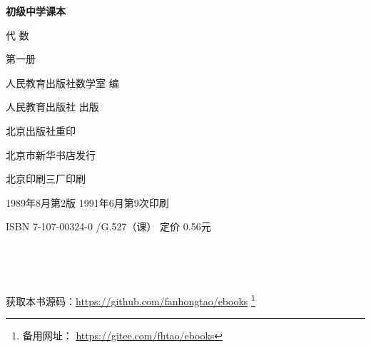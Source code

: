 \begin{titlepage}
    \begin{center}
        \vspace*{3cm}

        {\Large \textbf{初级中学课本} }

        \vspace{1cm}

        {\Huge 代 \qquad 数}

        \vspace{1.5cm}

        {\Large 第一册}

        \vspace{1cm}

        {\Large 人民教育出版社数学室 \quad 编}

        \vfill

        人民教育出版社 出版

        北京出版社重印

        北京市新华书店发行

        北京印刷三厂印刷

        1989年8月第2版  \qquad 1991年6月第9次印刷

        ISBN 7-107-00324-0 /G.527（课） \quad 定价 0.56元

        \,

        \,

        获取本书源码：\url{https://github.com/fanhongtao/ebooks} \footnote{备用网址： \url{https://gitee.com/fhtao/ebooks} }
    \end{center}
 \end{titlepage}

